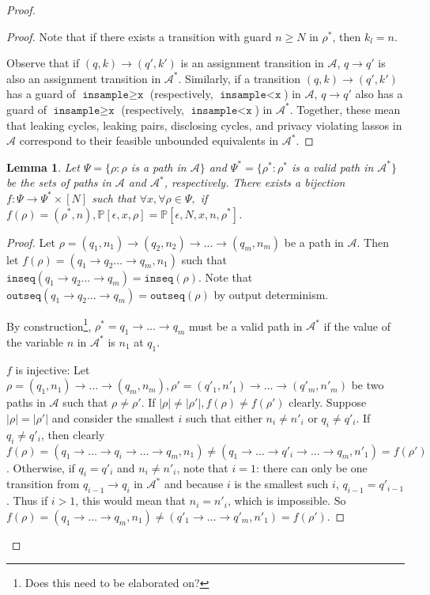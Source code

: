 \documentclass[12pt]{article}
\newcommand{\PP}{\mathbb{P}}
\newcommand{\gguard}{\texttt{insample}\geq \texttt{x}}
\newcommand{\lguard}{\texttt{insample} < \texttt{x}}
\newtheorem{lemma}[thm]{Lemma}
\theoremstyle{definition}
\begin{document}
\begin{proof}
\begin{proof}
	Note that if there exists a transition with guard $n \geq N$ in $\rho^*$, then $k_l = n$. 

	
	Observe that if $(q, k)\to (q', k')$ is an assignment transition in $\mathcal{A}$, $q \to q'$ is also an assignment transition in $\mathcal{A}^*$. 
	Similarly, if a transition $(q, k)\to (q', k')$ has a guard of $\gguard$ (respectively, $\lguard$) in $\mathcal{A}$, $q\to q'$ also has a guard of $\gguard$ (respectively, $\lguard$) in $\mathcal{A}^*$. Together, these mean that leaking cycles, leaking pairs, disclosing cycles, and privacy violating lassos in $\mathcal{A}$ correspond to their feasible unbounded equivalents in $\mathcal{A}^*$.

\end{proof}

\begin{lemma}\label{pathequivalence}
	Let $\Psi = \{\rho: \rho$ is a path in $\mathcal{A}\}$ and $\Psi^* = \{\rho^*: \rho^*$ is a valid path in $\mathcal{A}^*\}$ be the sets of paths in $\mathcal{A}$ and $\mathcal{A}^*$, respectively. There exists a bijection $f: \Psi\to \Psi^*\times [N]$ such that $\forall x, \forall \rho\in \Psi,$ if $f(\rho) = (\rho^*, n), \PP[\epsilon, x, \rho] = \PP[\epsilon, N, x, n, \rho^*]$.
\end{lemma}

\begin{proof}
	Let $\rho = (q_1, n_1)\to(q_2, n_2)\to \ldots \to (q_m, n_m)$ be a path in $\mathcal{A}$. Then let $f(\rho) = (q_1\to q_2\ldots \to q_m, n_1)$ such that $\texttt{inseq}(q_1\to q_2\ldots \to q_m) = \texttt{inseq}(\rho)$. Note that $\texttt{outseq}(q_1\to q_2\ldots \to q_m) = \texttt{outseq}(\rho)$ by output determinism.
	
	By construction\footnote{Does this need to be elaborated on?}, $\rho^* = q_1\to\ldots\to q_m$ must be a valid path in $\mathcal{A}^*$ if the value of the variable $n$ in $\mathcal{A}^*$ is $n_1$ at $q_1$.

	$f$ is injective: Let $\rho = (q_1, n_1)\to \ldots \to (q_m, n_m), \rho' = (q'_1, n'_1)\to \ldots \to (q'_m, n'_m)$ be two paths in $\mathcal{A}$ such that $\rho \neq \rho'$. If $|\rho| \neq |\rho'|, f(\rho) \neq f(\rho')$ clearly. 
	Suppose $|\rho| = |\rho'|$ and consider the smallest $i$ such that either $n_i \neq n'_i$ or $q_i \neq q'_i$. If $q_i \neq q'_i$, then clearly $f(\rho) = (q_1\to\ldots\to q_i\to \ldots \to q_m, n_1)\neq (q_1\to\ldots\to q'_i\to \ldots \to q_m, n'_1) = f(\rho')$. 
	Otherwise, if $q_i = q'_i$ and $n_i \neq n'_i$, note that $i = 1$: there can only be one transition from $q_{i-1}\to q_{i}$ in $\mathcal{A}^*$ and because $i$ is the smallest such $i$, $q_{i-1} = q'_{i-1}$. Thus if $i > 1$, this would mean that $n_i = n'_i$, which is impossible. So $f(\rho) = (q_1\to\ldots\to q_m, n_1) \neq (q'_1\to\ldots\to q'_m, n'_1) = f(\rho')$.


\end{proof}
\end{proof}
\end{document}

